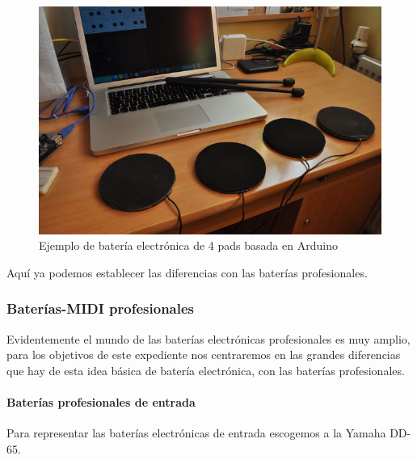 \documentclass[a4paper,11pt,oneside]{book}
\begin{document}
\begin{figure}[H]
\begin{center}
\includegraphics[scale=1.1]{Imagenes/drum-arduino.jpg}
\caption{Ejemplo de batería electrónica de 4 pads basada en Arduino}
\label{Ejemplo de batería electrónica de 4 pads basada en Arduino}
\end{center}
\end{figure}


Aquí ya podemos establecer las diferencias con las baterías profesionales.
 

\subsubsection{Baterías-MIDI profesionales}

Evidentemente el mundo de las baterías electrónicas profesionales es muy amplio, para los objetivos de este expediente nos centraremos en las grandes diferencias que hay de esta idea básica de batería electrónica, con las baterías profesionales.

\paragraph{Baterías profesionales de entrada}

Para representar las baterías electrónicas de entrada escogemos a la Yamaha DD-65.
\end{document}
